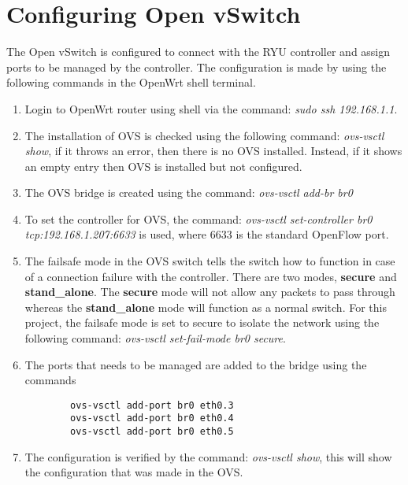 \section{Configuring Open vSwitch}
The Open vSwitch is configured to connect with the RYU controller and assign ports to be managed by the controller. The configuration is made by using the following commands in the OpenWrt shell terminal.
\begin{enumerate}
	\item Login to OpenWrt router using shell via the command: \textit{sudo ssh 192.168.1.1}.
	\item The installation of OVS is checked using the following command: \textit{ovs-vsctl show}, if it throws an error, then there is no OVS installed. Instead, if it shows an empty entry then OVS is installed but not configured.
	\item The OVS bridge is created using the command: \textit{ovs-vsctl add-br br0}
	\item To set the controller for OVS, the command: \textit{ovs-vsctl set-controller br0 tcp:192.168.1.207:6633} is used, where 6633 is the standard OpenFlow port.
	\item The failsafe mode in the OVS switch tells the switch how to function in case of a connection failure with the controller. There are two modes, \textbf{secure} and \textbf{stand\_alone}. The \textbf{secure} mode will not allow any packets to pass through whereas the \textbf{stand\_alone} mode will function as a normal switch. For this project, the failsafe mode is set to secure to isolate the network using the following command: \textit{ovs-vsctl set-fail-mode br0 secure}.
	\item The ports that needs to be managed are added to the bridge using the commands
	\begin{lstlisting}
		ovs-vsctl add-port br0 eth0.3
		ovs-vsctl add-port br0 eth0.4
		ovs-vsctl add-port br0 eth0.5
	\end{lstlisting}
	\item The configuration is verified by the command: \textit{ovs-vsctl show}, this will show the configuration that was made in the OVS.
	
\end{enumerate}
